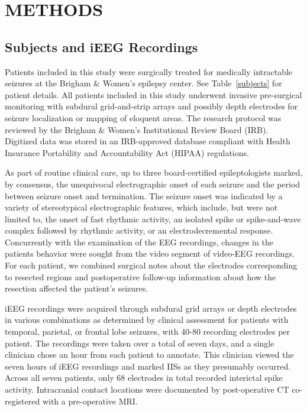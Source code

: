 \documentclass[letterpaper, 10pt, conference]{ieeeconf}      %
\begin{document}
\section{METHODS}

\subsection{Subjects and iEEG Recordings}
Patients included in this study were surgically treated for medically intractable seizures at the Brigham \& Women's epilepsy center. See Table~\ref{subjects} for patient details. All patients included in this study underwent invasive pre-surgical monitoring with subdural grid-and-strip arrays and possibly depth electrodes for seizure localization or mapping of eloquent areas. The research protocol was reviewed by the Brigham \& Women's Institutional Review Board (IRB). Digitized data was stored in an IRB-approved database compliant with Health Insurance Portability and Accountability Act (HIPAA) regulations.
 
As part of routine clinical care, up to three board-certified epileptologists marked, by consensus, the unequivocal electrographic onset of each seizure and the period between seizure onset and termination. The seizure onset was indicated by a variety of stereotypical electrographic features, which include, but were not limited to, the onset of fast rhythmic activity, an isolated spike or spike-and-wave complex followed by rhythmic activity, or an electrodecremental response. Concurrently with the examination of the EEG recordings, changes in the patients behavior were sought from the video segment of video-EEG recordings. For each patient, we combined surgical notes about the electrodes corresponding to resected regions and postoperative follow-up information about how the resection affected the patient's seizures.

iEEG recordings were acquired through subdural grid arrays or depth electrodes in various combinations as determined by clinical assessment for patients with temporal, parietal, or frontal lobe seizures, with 40-80 recording electrodes per patient. The recordings were taken over a total of seven days, and a single clinician chose an hour from each patient to annotate. This clinician viewed the seven hours of iEEG recordings and marked IISs as they presumably occurred. Across all seven patients, only 68 electrodes in total recorded interictal spike activity. Intracranial contact locations were documented by post-operative CT co-registered with a pre-operative MRI. %
\end{document}
